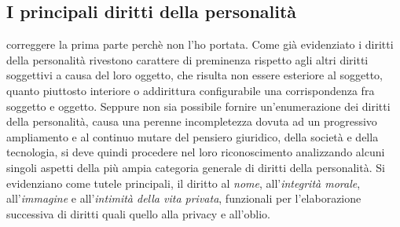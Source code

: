 
\subsection{I principali diritti della personalità}correggere la prima parte perchè non l'ho portata.
Come già evidenziato i diritti della personalità rivestono carattere di preminenza rispetto agli altri diritti soggettivi a causa del loro oggetto, che risulta non essere esteriore al soggetto, quanto piuttosto interiore o addirittura configurabile una corrispondenza fra soggetto e oggetto.
Seppure non sia possibile fornire un'enumerazione dei diritti della personalità, causa una perenne incompletezza dovuta ad un progressivo ampliamento 
e al continuo mutare del pensiero giuridico, della società e della tecnologia, si deve quindi procedere nel loro riconoscimento analizzando alcuni singoli aspetti della più ampia categoria generale di diritti della personalità. Si evidenziano come tutele principali, il diritto al \textit{nome}, all'\textit{integrità morale}, all'\textit{immagine} e all'\textit{intimità della vita privata}, funzionali per l'elaborazione successiva di diritti quali quello alla privacy e all'oblio.


